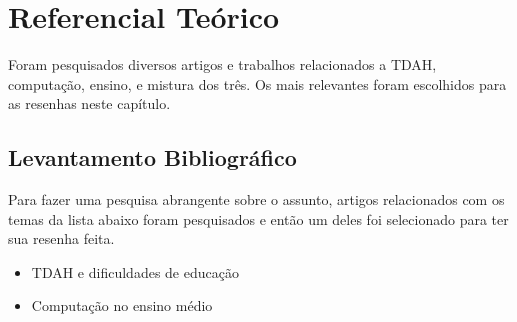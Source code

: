 \chapter{Referencial Teórico}

Foram pesquisados diversos artigos e trabalhos relacionados a TDAH, computação, ensino, e mistura dos três. Os mais relevantes foram escolhidos para as resenhas neste capítulo.

\section{Levantamento Bibliográfico}

Para fazer uma pesquisa abrangente sobre o assunto, artigos relacionados com os temas da lista abaixo foram pesquisados e então um deles foi selecionado para ter sua resenha feita.

\begin{itemize}
    \item TDAH e dificuldades de educação
    \item Computação no ensino médio
\end{itemize}

